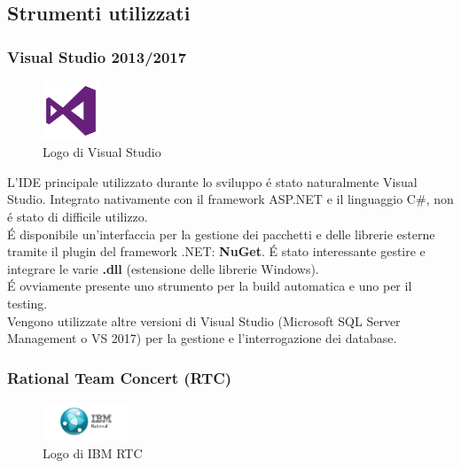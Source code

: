 \subsection{Strumenti utilizzati}

\subsubsection{Visual Studio 2013/2017}
\begin{figure}
    \begin{center}
        \includegraphics[width=0.15\textwidth]{./res/img/visual-studio-2013-logo.png}
        \caption{Logo di Visual Studio}
    \end{center}
\end{figure}

L'IDE principale utilizzato durante lo sviluppo é stato naturalmente Visual Studio. Integrato nativamente con il framework ASP.NET e il linguaggio C\#, non é stato di difficile utilizzo. \\ É disponibile un'interfaccia per la gestione dei pacchetti e delle librerie esterne tramite il plugin del framework .NET: \textbf{NuGet}. É stato interessante gestire e integrare le varie \textbf{.dll} (estensione delle librerie Windows). \\ É ovviamente presente uno strumento per la build automatica e uno per il testing. \\
Vengono utilizzate altre versioni di Visual Studio (Microsoft SQL Server Management o VS 2017) per la gestione e l'interrogazione dei database.

\subsubsection{Rational Team Concert (RTC)}

\begin{figure}
    \begin{center}
        \includegraphics[width=0.23\textwidth]{./res/img/1-IBM-rational-1.png}
        \caption{Logo di IBM RTC}
    \end{center}
\end{figure}

